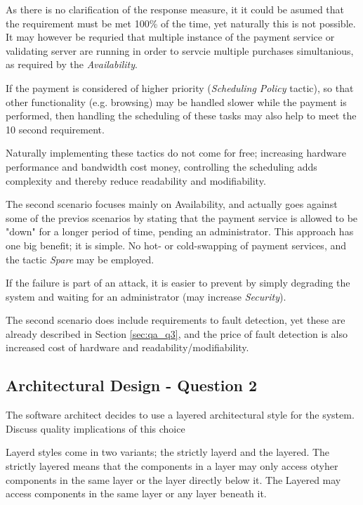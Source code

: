 As there is no clarification of the response measure, it it could be asumed that the requirement must be met 100\% of the time, yet naturally this is not possible. It may however be requried that multiple instance of the payment service or validating server are running in order to servcie multiple purchases simultanious, as required by the \emph{Availability}.

If the payment is considered of higher priority (\emph{Scheduling Policy} tactic), so that other functionality (e.g. browsing) may be handled slower while the payment is performed, then handling the scheduling of these tasks may also help to meet the 10 second requirement.

Naturally implementing these tactics do not come for free; increasing hardware performance and bandwidth cost money, controlling the scheduling adds complexity and thereby reduce readability and modifiability.

The second scenario focuses mainly on Availability, and actually goes against some of the previos scenarios by stating that the payment service is allowed to be "down" for a longer period of time, pending an administrator. This approach has one big benefit; it is simple. No hot- or cold-swapping of payment services, and the tactic \emph{Spare} may be employed.

If the failure is part of an attack, it is easier to prevent by simply degrading the system and waiting for an administrator (may increase \emph{Security}).

The second scenario does include requirements to fault detection, yet these are already described in Section \ref{sec:qa_q3}, and the price of fault detection is also increased cost of hardware and readability/modifiability.

\subsection{Architectural Design - Question 2}

\begin{question}
The software architect decides to use a layered architectural
style for the system. Discuss quality implications of this choice
\end{question}

Layerd styles come in two variants; the strictly layerd and the layered. The strictly layered means that the components in a layer may only access otyher components in the same layer or the layer directly below it. The Layered may access components in the same layer or any layer beneath it.

